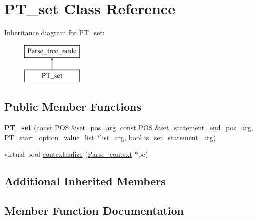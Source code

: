 \hypertarget{classPT__set}{}\section{P\+T\+\_\+set Class Reference}
\label{classPT__set}
Inheritance diagram for P\+T\+\_\+set\+:\begin{figure}[H]
\begin{center}
\leavevmode
\includegraphics[height=2.000000cm]{classPT__set}
\end{center}
\end{figure}
\subsection*{Public Member Functions}
\begin{DoxyCompactItemize}
\item 
\mbox{\label{classPT__set_a4d5b0fad5bc11ce2aa699f38e485d166}} 
{\bfseries P\+T\+\_\+set} (const \mbox{\hyperlink{structYYLTYPE}{P\+OS}} \&set\+\_\+pos\+\_\+arg, const \mbox{\hyperlink{structYYLTYPE}{P\+OS}} \&set\+\_\+statement\+\_\+end\+\_\+pos\+\_\+arg, \mbox{\hyperlink{classPT__start__option__value__list}{P\+T\+\_\+start\+\_\+option\+\_\+value\+\_\+list}} $\ast$list\+\_\+arg, bool is\+\_\+set\+\_\+statement\+\_\+arg)
\item 
virtual bool \mbox{\hyperlink{classPT__set_afe467df4c229a07e6264c3547d5b7c36}{contextualize}} (\mbox{\hyperlink{structParse__context}{Parse\+\_\+context}} $\ast$pc)
\end{DoxyCompactItemize}
\subsection*{Additional Inherited Members}


\subsection{Member Function Documentation}
\mbox{\label{classPT__set_afe467df4c229a07e6264c3547d5b7c36}} 
